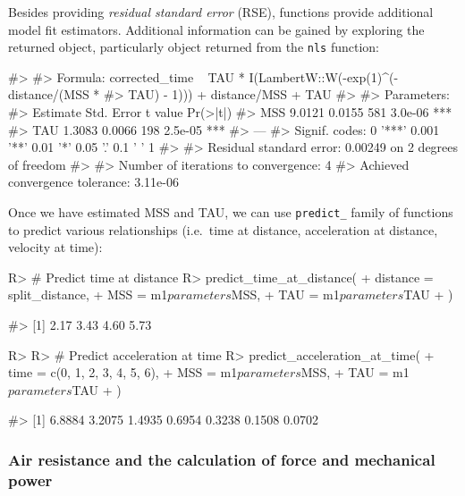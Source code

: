 \documentclass[
]{jss}
\begin{document}
Besides providing \emph{residual standard error} (RSE),  functions provide additional model fit estimators. Additional information can be gained by exploring the returned object, particularly object returned from the \texttt{nls} function:

\begin{CodeChunk}
\begin{CodeOutput}
#> 
#> Formula: corrected_time ~ TAU * I(LambertW::W(-exp(1)^(-distance/(MSS * 
#>     TAU) - 1))) + distance/MSS + TAU
#> 
#> Parameters:
#>     Estimate Std. Error t value Pr(>|t|)    
#> MSS   9.0121     0.0155     581  3.0e-06 ***
#> TAU   1.3083     0.0066     198  2.5e-05 ***
#> ---
#> Signif. codes:  0 '***' 0.001 '**' 0.01 '*' 0.05 '.' 0.1 ' ' 1
#> 
#> Residual standard error: 0.00249 on 2 degrees of freedom
#> 
#> Number of iterations to convergence: 4 
#> Achieved convergence tolerance: 3.11e-06
\end{CodeOutput}
\end{CodeChunk}

Once we have estimated MSS and TAU, we can use \texttt{predict\_} family of functions to predict various relationships (i.e.~time at distance, acceleration at distance, velocity at time):

\begin{CodeChunk}
\begin{CodeInput}
R> # Predict time at distance
R> predict_time_at_distance(
+   distance = split_distance,
+   MSS = m1$parameters$MSS,
+   TAU = m1$parameters$TAU
+ )
\end{CodeInput}
\begin{CodeOutput}
#> [1] 2.17 3.43 4.60 5.73
\end{CodeOutput}
\begin{CodeInput}
R> 
R> # Predict acceleration at time
R> predict_acceleration_at_time(
+   time = c(0, 1, 2, 3, 4, 5, 6),
+   MSS = m1$parameters$MSS,
+   TAU = m1$parameters$TAU
+ )
\end{CodeInput}
\begin{CodeOutput}
#> [1] 6.8884 3.2075 1.4935 0.6954 0.3238 0.1508 0.0702
\end{CodeOutput}
\end{CodeChunk}

\hypertarget{air-resistance-and-the-calculation-of-force-and-mechanical-power}{%
\subsubsection{Air resistance and the calculation of force and mechanical power}\label{air-resistance-and-the-calculation-of-force-and-mechanical-power}}
\end{document}
